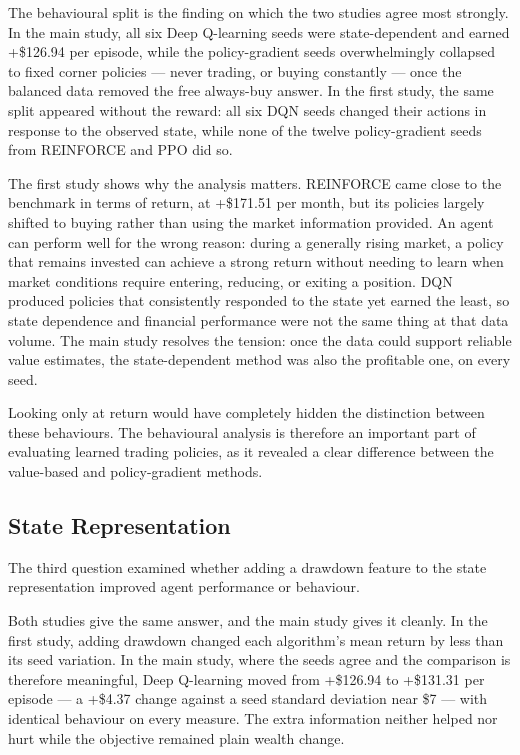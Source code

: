 The behavioural split is the finding on which the two studies agree most
strongly. In the main study, all six Deep Q-learning seeds were
state-dependent and earned +\$126.94 per episode, while the
policy-gradient seeds overwhelmingly collapsed to fixed corner policies
--- never trading, or buying constantly --- once the balanced data
removed the free always-buy answer. In the first study, the same split
appeared without the reward: all six DQN seeds changed their actions in
response to the observed state, while none of the twelve policy-gradient
seeds from REINFORCE and PPO did so.

The first study shows why the analysis matters. REINFORCE came close to
the benchmark in terms of return, at +\$171.51 per month, but its
policies largely shifted to buying rather than using the market
information provided. An agent can perform well for the wrong reason:
during a generally rising market, a policy that remains invested can
achieve a strong return without needing to learn when market conditions
require entering, reducing, or exiting a position. DQN produced policies
that consistently responded to the state yet earned the least, so state
dependence and financial performance were not the same thing at that
data volume. The main study resolves the tension: once the data could
support reliable value estimates, the state-dependent method was also
the profitable one, on every seed.

Looking only at return would have completely hidden the distinction
between these behaviours. The behavioural analysis is therefore an
important part of evaluating learned trading policies, as it revealed a
clear difference between the value-based and policy-gradient methods.

\subsection{State Representation}

The third question examined whether adding a drawdown feature to the
state representation improved agent performance or behaviour.

Both studies give the same answer, and the main study gives it cleanly.
In the first study, adding drawdown changed each algorithm's mean return by
less than its seed variation. In the main study, where the seeds agree
and the comparison is therefore meaningful, Deep Q-learning moved from
+\$126.94 to +\$131.31 per episode --- a +\$4.37 change against a seed
standard deviation near \$7 --- with identical behaviour on every
measure. The extra information neither helped nor hurt while the
objective remained plain wealth change.

